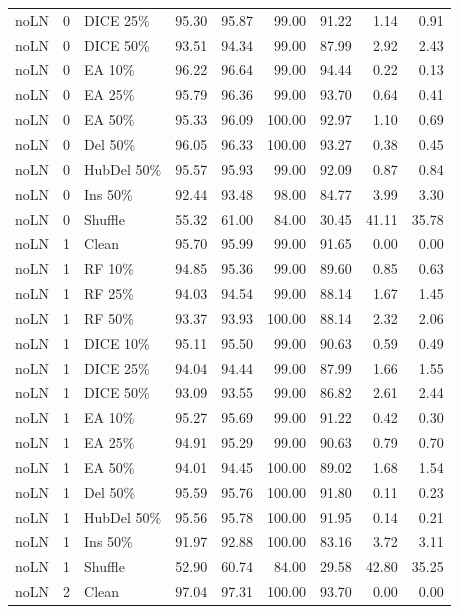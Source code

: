 {\begin{longtable}{rllrrrrrr}
noLN & 0 & DICE 25\% & 95.30 & 95.87 & 99.00 & 91.22 & 1.14 & 0.91 \\
noLN & 0 & DICE 50\% & 93.51 & 94.34 & 99.00 & 87.99 & 2.92 & 2.43 \\
noLN & 0 & EA 10\% & 96.22 & 96.64 & 99.00 & 94.44 & 0.22 & 0.13 \\
noLN & 0 & EA 25\% & 95.79 & 96.36 & 99.00 & 93.70 & 0.64 & 0.41 \\
noLN & 0 & EA 50\% & 95.33 & 96.09 & 100.00 & 92.97 & 1.10 & 0.69 \\
noLN & 0 & Del 50\% & 96.05 & 96.33 & 100.00 & 93.27 & 0.38 & 0.45 \\
noLN & 0 & HubDel 50\% & 95.57 & 95.93 & 99.00 & 92.09 & 0.87 & 0.84 \\
noLN & 0 & Ins 50\% & 92.44 & 93.48 & 98.00 & 84.77 & 3.99 & 3.30 \\
noLN & 0 & Shuffle & 55.32 & 61.00 & 84.00 & 30.45 & 41.11 & 35.78 \\
noLN & 1 & Clean & 95.70 & 95.99 & 99.00 & 91.65 & 0.00 & 0.00 \\
noLN & 1 & RF 10\% & 94.85 & 95.36 & 99.00 & 89.60 & 0.85 & 0.63 \\
noLN & 1 & RF 25\% & 94.03 & 94.54 & 99.00 & 88.14 & 1.67 & 1.45 \\
noLN & 1 & RF 50\% & 93.37 & 93.93 & 100.00 & 88.14 & 2.32 & 2.06 \\
noLN & 1 & DICE 10\% & 95.11 & 95.50 & 99.00 & 90.63 & 0.59 & 0.49 \\
noLN & 1 & DICE 25\% & 94.04 & 94.44 & 99.00 & 87.99 & 1.66 & 1.55 \\
noLN & 1 & DICE 50\% & 93.09 & 93.55 & 99.00 & 86.82 & 2.61 & 2.44 \\
noLN & 1 & EA 10\% & 95.27 & 95.69 & 99.00 & 91.22 & 0.42 & 0.30 \\
noLN & 1 & EA 25\% & 94.91 & 95.29 & 99.00 & 90.63 & 0.79 & 0.70 \\
noLN & 1 & EA 50\% & 94.01 & 94.45 & 100.00 & 89.02 & 1.68 & 1.54 \\
noLN & 1 & Del 50\% & 95.59 & 95.76 & 100.00 & 91.80 & 0.11 & 0.23 \\
noLN & 1 & HubDel 50\% & 95.56 & 95.78 & 100.00 & 91.95 & 0.14 & 0.21 \\
noLN & 1 & Ins 50\% & 91.97 & 92.88 & 100.00 & 83.16 & 3.72 & 3.11 \\
noLN & 1 & Shuffle & 52.90 & 60.74 & 84.00 & 29.58 & 42.80 & 35.25 \\
noLN & 2 & Clean & 97.04 & 97.31 & 100.00 & 93.70 & 0.00 & 0.00 \\

\end{longtable}}
